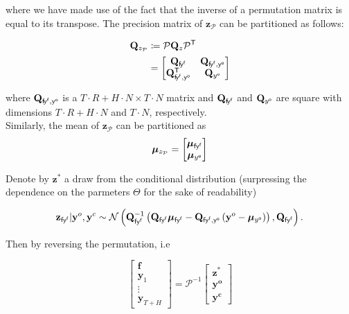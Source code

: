 \documentclass[notitlepage,a4paper,12pt]{article}
\newcommand{\transpose}[1]{{#1}^{\sf{T}}}
\begin{document}
where we have made use of the fact that the inverse of a permutation matrix is equal to its transpose.  The precision matrix of $\mathbf{z}_{\mathcal{P}}$ can be partitioned as follows: 

\begin{align*}
    \mathbf{Q}_{z_{\mathcal{P}}} &\coloneqq  \mathcal{P} \mathbf{Q}_z \transpose{\mathcal{P}} \\
    &= 
    \begin{bmatrix}
        \mathbf{Q}_{\sf{f}\! y^{\sf{f}}} & \mathbf{Q}_{\sf{f}\! y^{\sf{f}}, y^{\sf{o}}} \\ 
        \mathbf{Q}^{\sf{T}}_{\sf{f}\! y^{\sf{f}}, y^{\sf{o}}} & \mathbf{Q}_{y^{\sf{o}}}
    \end{bmatrix}
\end{align*}

where $\mathbf{Q}_{\sf{f}\! y^{\sf{f}}, y^{\sf{o}}}$ is a 
$T\!\cdot\!R + H\!\cdot\!N \times T\!\cdot\!N$ matrix and $\mathbf{Q}_{\sf{f}\! y^{\sf{f}}}$ and $\mathbf{Q}_{y^{\sf{o}}}$ are square with dimensions $T\!\cdot\!R + H\!\cdot\!N$ and $T\!\cdot\!N $, respectively.\\


Similarly, the mean of $\mathbf{z}_{\mathcal{P}}$ can be partitioned as 
$$
\boldsymbol{\mu}_{z_{\mathcal{P}}} = 
\begin{bmatrix}
    \boldsymbol{\mu}_{\sf{f} y^{\sf{f}}} \\
    \boldsymbol{\mu}_{y^{\sf{o}}}
\end{bmatrix}
$$

Denote by $\mathbf{z}^*$ a draw from the conditional distribution (surpressing the dependence on the parmeters $\Theta$ for the sake of readability)

\begin{equation*}
    \mathbf{z}_{\sf{f} y^{\sf{f}}} | \mathbf{y}^{o}, \mathbf{y}^{c} \sim 
    \mathcal{N}\left(
        \mathbf{Q}^{-1}_{\sf{f} y^{\sf{f}}}\left( \mathbf{Q}_{\sf{f} y^{\sf{f}}}\boldsymbol{\mu}_{\sf{f} y^{\sf{f}}} - \mathbf{Q}_{\sf{f} y^{\sf{f}}, y^{\sf{o}}}\left(\mathbf{y}^o-\boldsymbol{\mu}_{y^{\sf{o}}}\right)\right)
    ,
    \mathbf{Q}_{\sf{f} y^{\sf{f}}}
    \right).
\end{equation*}

Then by reversing the permutation, i.e 

$$
\begin{bmatrix}
    \mathbf{f} \\
    \mathbf{y}_1 \\
    \vdots \\
    \mathbf{y}_{T+H} 
\end{bmatrix}
= 
\mathcal{P}^{-1} 
\begin{bmatrix}
    \mathbf{z}^*\\
    \mathbf{y^{o}} \\
    \mathbf{y^{c}}
\end{bmatrix}
$$
\end{document}
